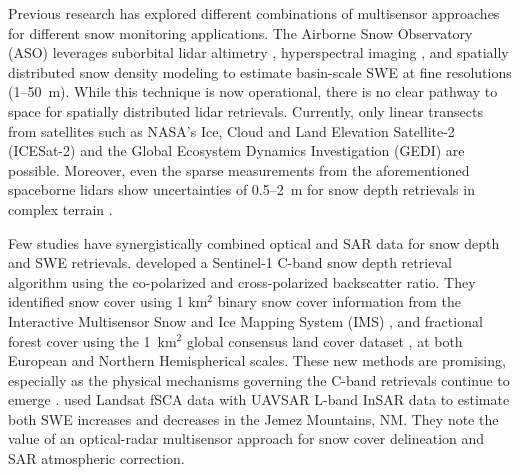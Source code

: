 Previous research has explored different combinations of multisensor approaches for different snow monitoring applications. The Airborne Snow Observatory (ASO) \citep{painterAirborneSnowObservatory2016} leverages suborbital lidar altimetry \citep{deemsLidarMeasurementSnow2013}, hyperspectral imaging \citep{nolinMappingAlpineSnow1993}, and spatially distributed snow density modeling \citep{marksSpatiallyDistributedEnergy1999,hedrickDirectInsertionNASA2018,meyerOperationalWaterForecast2023a} to estimate basin-scale SWE at fine resolutions (1--50~m). While this technique is now operational, there is no clear pathway to space for spatially distributed lidar retrievals. Currently, only linear transects from satellites such as NASA's Ice, Cloud and Land Elevation Satellite-2 (ICESat-2) \citep{abdalatiICESat2LaserAltimetry2010} and the Global Ecosystem Dynamics Investigation (GEDI) \citep{dubayahGlobalEcosystemDynamics2020} are possible. Moreover, even the sparse measurements from the aforementioned spaceborne lidars show uncertainties of 0.5--2~m for snow depth retrievals in complex terrain \citep{enderlinUncertaintyICESat2ATL062022, deschamps-bergerEvaluationSnowDepth2023}. 


Few studies have synergistically combined optical and SAR data for snow depth and SWE retrievals. \cite{lievensSnowDepthVariability2019,lievensSentinel1SnowDepth2022} developed a Sentinel-1 C-band snow depth retrieval algorithm using the co-polarized and cross-polarized backscatter ratio. They identified snow cover using 1 km$^{2}$ binary snow cover information from the Interactive Multisensor Snow and Ice Mapping System (IMS) \citep{u.s.nationalicecenterIMSDailyNorthern2008, ramsayInteractiveMultisensorSnow1998, helfrichEnhancementsForthcomingDevelopments2007}, and fractional forest cover using the 1~km$^{2}$ global consensus land cover dataset \citep{tuanmuGlobal1kmConsensus2014}, at both European and Northern Hemispherical scales. These new methods are promising, especially as the physical mechanisms governing the C-band retrievals continue to emerge \citep{zhuModelingScatteringDense2023}. \cite{tarriconeEstimatingSnowAccumulation2023a} used Landsat fSCA data with UAVSAR \citep{hensleyUAVSARInstrumentDescription2008} L-band InSAR data to estimate both SWE increases and decreases in the Jemez Mountains, NM. They note the value of an optical-radar multisensor approach for snow cover delineation and SAR atmospheric correction. 

